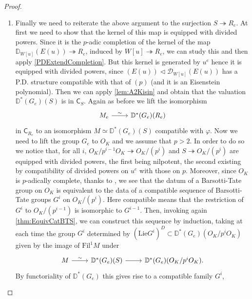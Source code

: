 \begin{proof}
\begin{enumerate}
\item Finally we need to reiterate the above argument to the surjection
	$S \twoheadrightarrow R_e$.
	At first we need to show that the kernel of this map is equipped with divided powers.
	Since it is the $p$-adic completion of the kernel
	of the map $\mathbb{D}_{W[u]}(E(u)) \twoheadrightarrow R_e$,
	induced by $W[u] \twoheadrightarrow R_e$, we can study this and
	then apply \cref{PDExtendCompletion}.
	But this kernel is generated by $u^e$ hence it is equipped with divided powers,
	since $(E(u)) \triangleleft \mathcal{D}_{W[u]}(E(u))$ has a P.D. structure
	compatible with that of $(p)$ (and it is an Eisenstein polynomial).
	Then we can apply \cref{lem:A2Kisin} and obtain that the valuation
	$\mathbb{D}^*(G_e)(S)$ is in $\mathsf{C}_{S}$.
	Again as before we lift the isomorphism 
	\begin{equation*}
	\begin{tikzcd}
		M_e \arrow[r, "\sim", rightarrow] &
		\mathbb{D}^*(G_e)(R_e)
	\end{tikzcd}
	\end{equation*}
	in $\mathsf{C}_{R_e}$ to an isomorphism $M \simeq \mathbb{D}^*(G_e)(S)$
	compatible with $\varphi$.
	Now we need to lift the group $G_e$ to $O_K$ and we assume that $p > 2$.
	In order to do so we notice that, for all $i$,
	$O_K/p^{i-1}O_K \twoheadrightarrow O_K/ (p^i)$ and
	$S \twoheadrightarrow O_K/ (p^i)$ are equipped with
	divided powers, the first being nilpotent, the second existing by compatibility
	of divided powers on $u^e$ with those on $p$.
	Moreover, since $O_K$ is $p$-adically complete, thanks to \cite[Lemma 2.4.4]{deJong},
	we see that the datum of a Barsotti-Tate group on $O_K$ is equivalent to
	the data of a compatible sequence of Barsotti-Tate groups $G^i$ on $O_K/ (p^i)$.
	Here compatible means that the restriction of $G^i$ to $O_K/ (p^{i-1})$
	is isomorphic to $G^{i-1}$.
	Then, invoking again \cref{thm:EquivCatBTS}, we can construct this sequence by induction,
	taking at each time the group $G^i$ determined by $(\mathrm{Lie} G^i)^D \subset
	\mathbb{D}^*(G_e)(O_K/p^iO_K)$ given by the image of $\mathrm{Fil}^1 M$ under
	\begin{equation*}
	\begin{tikzcd}
		M \arrow[r, "\sim", rightarrow] &
		\mathbb{D}^*(G_e)(S) \arrow[r, "", rightarrow] &
		\mathbb{D}^*(G_e)(O_K/p^iO_K)
	.\end{tikzcd}
	\end{equation*}
	By functoriality of $\mathbb{D}^*(G_e)$ this gives rise to a compatible family $G^i$,

\end{enumerate}
\end{proof}
